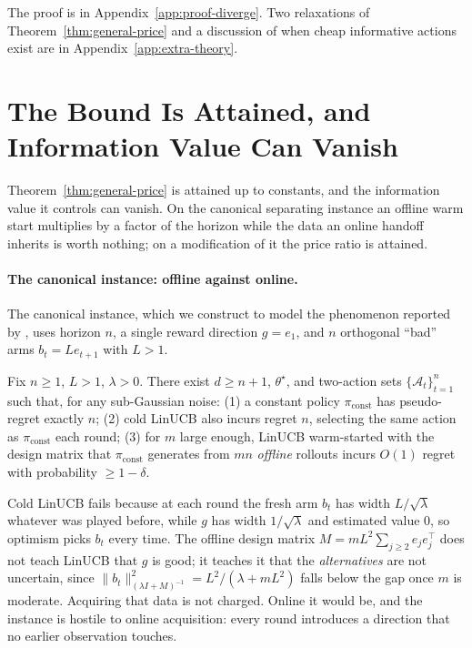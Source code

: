 \documentclass[anon]{alt2027} %
\begin{document}
The proof is in Appendix~\ref{app:proof-diverge}. Two relaxations of
Theorem~\ref{thm:general-price} and a discussion of when cheap informative
actions exist are in Appendix~\ref{app:extra-theory}.

\section{The Bound Is Attained, and Information Value Can Vanish}
\label{sec:catalog}

Theorem~\ref{thm:general-price} is attained up to constants, and the
information value it controls can vanish. On the canonical separating
instance an offline warm start multiplies by a factor of the horizon while the
data an online handoff inherits is worth nothing; on a modification of it the
price ratio is attained.

\paragraph{The canonical instance: offline against online.}
\label{sec:canonical}
The canonical instance, which we construct to model the phenomenon reported
by \citet{chen2024llmdecision}, uses
horizon $n$, a single reward direction $g=e_1$, and $n$ orthogonal ``bad''
arms $b_t=Le_{t+1}$ with $L>1$.

\begin{proposition}
\label{prop:three-way}
Fix $n\ge1$, $L>1$, $\lambda>0$. There exist $d\ge n+1$, $\theta^\star$, and
two-action sets $\{\mathcal A_t\}_{t=1}^n$ such that, for any sub-Gaussian
noise: (1) a constant policy $\pi_{\mathrm{const}}$ has pseudo-regret exactly
$n$; (2) cold LinUCB also incurs regret $n$, selecting the same action as
$\pi_{\mathrm{const}}$ each round; (3) for $m$ large enough, LinUCB
warm-started with the design matrix that $\pi_{\mathrm{const}}$ generates from
$mn$ \emph{offline} rollouts incurs $O(1)$ regret with probability $\ge1-\delta$.
\end{proposition}

Cold LinUCB fails because at each round the fresh arm $b_t$ has width
$L/\sqrt\lambda$ whatever was played before, while $g$ has width
$1/\sqrt\lambda$ and estimated value $0$, so optimism picks $b_t$ every time.
The offline design matrix $M=mL^2\sum_{j\ge2}e_je_j^\top$ does not teach
LinUCB that $g$ is good; it teaches it that the \emph{alternatives} are not
uncertain, since $\|b_t\|^2_{(\lambda I+M)^{-1}}=L^2/(\lambda+mL^2)$ falls
below the gap once $m$ is moderate. Acquiring that data is not charged.
Online it would be, and the instance is hostile to online acquisition: every
round introduces a direction that no earlier observation touches.
\end{document}
